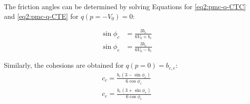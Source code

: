 The friction angles can be determined by solving Equations for \ref{eq2:pmc-q-CTC} and \ref{eq2:pmc-q-CTE} for $q(p=-V_0)=0$:

\begin{align}\label{eq2:pmc_phi}
    \sin \phi_c &= \frac{3b_c}{6V_0+b_c} \\
    \sin \phi_e &= \frac{3b_e}{6V_0-b_e} 
\end{align}

Similarly, the cohesions are obtained for $q(p=0)=b_{c,e}$:
\begin{align}\label{eq2:pmc_c}
    c_{c} =\frac{b_{c}\left(3-\sin \phi_{c}\right)}{6 \cos \phi_{c}} \\
    c_{e} =\frac{b_{e}\left(3+\sin \phi_{e}\right)}{6 \cos \phi_{e}}
\end{align}